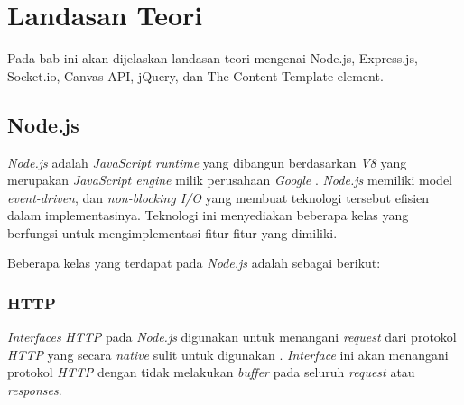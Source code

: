 \chapter{Landasan Teori}
\label{chap:teori}

Pada bab ini akan dijelaskan landasan teori mengenai Node.js, Express.js, Socket.io, Canvas API, jQuery, dan The Content Template element.

\section{Node.js}


\label{sec:Node.js}

\textit{Node.js} adalah \textit{JavaScript runtime} yang dibangun berdasarkan \textit{V8} yang merupakan \textit{JavaScript engine} milik perusahaan \textit{Google} \cite{dahl:09:nodejs}. \textit{Node.js} memiliki model \textit{event-driven}, dan \textit{non-blocking I/O} yang membuat teknologi tersebut efisien dalam implementasinya. Teknologi ini menyediakan beberapa kelas yang berfungsi untuk mengimplementasi fitur-fitur yang dimiliki.

Beberapa kelas yang terdapat pada \textit{Node.js} adalah sebagai berikut: 

\subsection{HTTP}
\textit{Interfaces} \textit{HTTP} pada \textit{Node.js} digunakan untuk menangani \textit{request} dari protokol \textit{HTTP} yang secara \textit{native} sulit untuk digunakan \cite{dahl:09:nodejsdocs}. \textit{Interface} ini akan menangani protokol \textit{HTTP} dengan tidak melakukan \textit{buffer} pada seluruh \textit{request} atau \textit{responses}.


